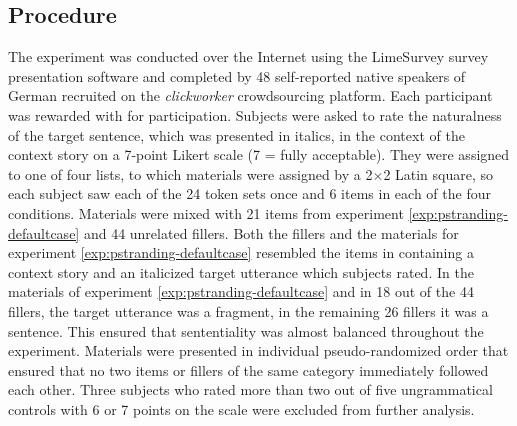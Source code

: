 \subsection{Procedure}
The experiment was conducted over the Internet using the LimeSurvey survey presentation software and completed by 48 self-reported native speakers of German recruited on the \textit{clickworker} crowdsourcing platform. Each participant was rewarded with  for participation. Subjects were asked to rate the naturalness of the target sentence, which was presented in italics, in the context of the context story on a 7-point Likert scale (7 = fully acceptable). They were assigned to one of four lists, to which materials were assigned by a 2$\times$2 Latin square, so each subject saw each of the 24 token sets once and 6 items in each of the four conditions. Materials were mixed with 21 items from experiment \ref{exp:pstranding-defaultcase} and 44 unrelated fillers. Both the fillers and the materials for experiment \ref{exp:pstranding-defaultcase} resembled the items in containing a context story and an italicized target utterance which subjects rated. In the materials of experiment \ref{exp:pstranding-defaultcase} and in 18 out of the 44 fillers, the target utterance was a fragment, in the remaining 26 fillers it was a sentence. This ensured that sententiality was almost balanced throughout the experiment. Materials were presented in individual pseudo-randomized order that ensured that no two items or fillers of the same category immediately followed each other. Three subjects who rated more than two out of five ungrammatical controls with 6 or 7 points on the scale were excluded from further analysis.

